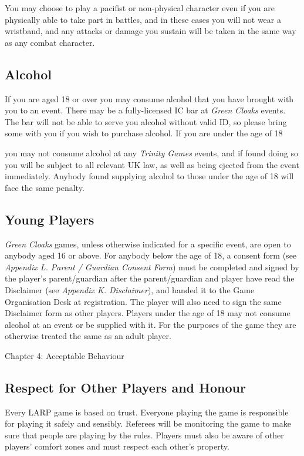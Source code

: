 \documentclass{scrbook}
\begin{document}
You may choose to play a pacifist or non-physical character even if you are physically able to take part in battles, and in these cases you will not wear a wristband, and any attacks or damage you sustain will be taken in the same way as any combat character.

\subsection{Alcohol}

If you are aged 18 or over you may consume alcohol that you have brought with you to an event. There may be a fully-licensed IC bar at \textit{Green Cloaks} events. The bar will not be able to serve you alcohol without valid ID, so please bring some with you if you wish to purchase alcohol. If you are under the age of 18

you may not consume alcohol at any \textit{Trinity Games} events, and if found doing so you will be subject to all relevant UK law, as well as being ejected from the event immediately. Anybody found supplying alcohol to those under the age of 18 will face the same penalty.

\subsection{Young Players}

\textit{Green Cloaks} games, unless otherwise indicated for a specific event, are open to anybody aged 16 or above. For anybody below the age of 18, a consent form (see \textit{Appendix L. Parent / Guardian Consent} \textit{Form}) must be completed and signed by the player's parent/guardian after the parent/guardian and player have read the Disclaimer (see \textit{Appendix K. Disclaimer}), and handed it to the Game Organisation Desk at registration. The player will also need to sign the same Disclaimer form as other players. Players under the age of 18 may not consume alcohol at an event or be supplied with it. For the purposes of the game they are otherwise treated the same as an adult player.

Chapter 4: Acceptable Behaviour

\subsection{Respect for Other Players and Honour}

Every LARP game is based on trust. Everyone playing the game is responsible for playing it safely and sensibly. Referees will be monitoring the game to make sure that people are playing by the rules. Players must also be aware of other players' comfort zones and must respect each other's property.
\end{document}
